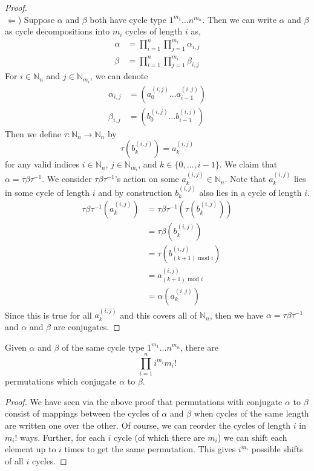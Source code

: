 \begin{proof}
\text{}\\$\Leftarrow$) Suppose $\alpha$ and $\beta$ both have cycle
type $1^{m_1}\dots n^{m_n}$. Then we can write $\alpha$ and $\beta$ as cycle decompositions into $m_i$ cycles of length $i$ as,
\begin{align*}
\alpha & = \prod_{i=1}^{n}\prod_{j=1}^{m_i}\alpha_{i,j}\\
\beta  & = \prod_{i=1}^{n}\prod_{j=1}^{m_i}\beta_{i,j}
\end{align*}
For $i\in\mathbb{N}_n$ and $j\in\mathbb{N}_{m_i}$, we can denote 
\begin{align*}
\alpha_{i,j} & = (a^{(i,j)}_0\dots a^{(i,j)}_{i-1})\\
\beta_{i,j}  & = (b^{(i,j)}_0\dots b^{(i,j)}_{i-1})
\end{align*}
Then we define $\tau:\mathbb{N}_n\to\mathbb{N}_n$ by 
\[
    \tau(b^{(i,j)}_k) = a^{(i,j)}_k
\] 
for any valid indices $i\in\mathbb{N}_n$, $j\in\mathbb{N}_{m_i}$, and $k\in\{0,\dots, i-1\}$.
We claim that $\alpha = \tau\beta\tau^{-1}$. We consider
$\tau\beta\tau^{-1}$'s action on some $a^{(i,j)}_k\in\mathbb{N}_n$.
Note that $a^{(i,j)}_k$ lies in some cycle of length $i$ and by
construction $b^{(i,j)}_k$ also lies in a cycle of length $i$.
\begin{align*}
\tau\beta\tau^{-1}(a^{(i,j)}_k) & = \tau\beta\tau^{-1}(\tau(b^{(i,j)}_k))        \\
& = \tau\beta(b^{(i,j)}_k)                       \\
& = \tau(b^{(i,j)}_{(k+1)\text{ mod }i}) \\
& = a^{(i,j)}_{(k+1)\text{ mod }i}      \\
& = \alpha(a^{(i,j)}_k)
\end{align*}
Since this is true for all $a^{(i,j)}_k$ and this covers all of $\mathbb{N}_n$, then we have $\alpha = \tau\beta\tau^{-1}$ and $\alpha$ and $\beta$ are conjugates.
\end{proof}
\begin{corr}\label{possible_conjugates}
Given $\alpha$ and $\beta$ of the same cycle type
$1^{m_1}\dots n^{m_n}$, there are
\[
\prod_{i=1}^{n}i^{m_i}m_i!
\]
permutations which conjugate $\alpha$ to $\beta$.
\end{corr}
\begin{proof}
We have seen via the above proof that permutations with conjugate
$\alpha$ to $\beta$ consist of mappings between the cycles of $\alpha$
and $\beta$ when cycles of the same length are written one over the
other. Of course, we can reorder the cycles of length $i$ in
$m_i!$ ways. Further, for each $i$ cycle (of which there are
$m_i$) we can shift each element up to $i$ times to get the
same permutation. This gives $i^{m_i}$ possible shifts of all $i$ cycles.
\end{proof}
